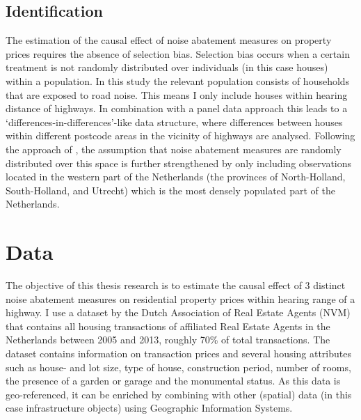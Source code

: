 \documentclass[12pt]{scrartcl}
\begin{document}
		\subsection{Identification}
		The estimation of the causal effect of noise abatement measures on property prices requires the absence of selection bias. Selection bias occurs when a certain treatment is not randomly distributed over individuals (in this case houses) within a population. In this study the relevant population consists of households that are exposed to road noise. This means I only include houses within hearing distance of highways. In combination with a panel data approach this leads to a `differences-in-differences'-like data structure, where differences between houses within different postcode areas in the vicinity of highways are analysed. Following the approach of \cite{Theebe2004}, the assumption that noise abatement measures are randomly distributed over this space is further strengthened by only including observations located in the western part of the Netherlands (the provinces of North-Holland, South-Holland, and Utrecht) which is the most densely populated part of the Netherlands.
		
	\section{Data}
	\label{sec:data}	
	The objective of this thesis research is to estimate the causal effect of 3 distinct noise abatement measures on residential property prices within hearing range of a highway. I use a dataset by the Dutch Association of Real Estate Agents (NVM) that contains all housing transactions of affiliated Real Estate Agents in the Netherlands between 2005 and 2013, roughly 70\% of total transactions. The dataset contains information on transaction prices and several housing attributes such as house- and lot size, type of house, construction period, number of rooms, the presence of a garden or garage and the monumental status. As this data is geo-referenced, it can be enriched by combining with other (spatial) data (in this case infrastructure objects) using Geographic Information Systems.
	
\end{document}
